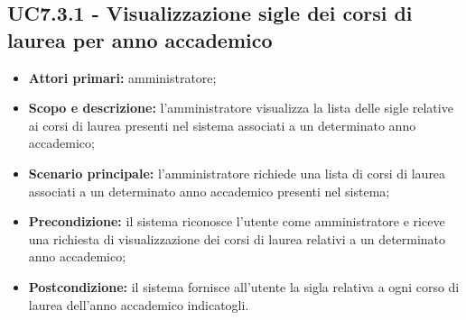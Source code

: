 \documentclass[AnalisiDeiRequisiti.tex]{subfiles}
\begin{document}
\subsection{UC7.3.1 - Visualizzazione sigle dei corsi di laurea per anno accademico}
\begin{itemize}
	\item \textbf{Attori primari:} amministratore;
	\item \textbf{Scopo e descrizione:} l'amministratore visualizza la lista delle sigle relative ai corsi di laurea presenti nel sistema associati a un determinato anno accademico;
	\item \textbf{Scenario principale:} l'amministratore richiede una lista di corsi di laurea associati a un determinato anno accademico presenti nel sistema;
	\item \textbf{Precondizione:} il sistema riconosce l'utente come amministratore e riceve una richiesta di visualizzazione dei corsi di laurea relativi a un determinato anno accademico; 
	\item \textbf{Postcondizione:} il sistema fornisce all'utente la sigla relativa a ogni corso di laurea dell'anno accademico indicatogli.
\end{itemize}
\end{document}
